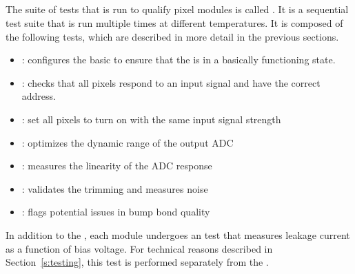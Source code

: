 
\newpage

\subsection{\fulltest}
\label{ss:fulltest}

The suite of tests that is run to qualify pixel modules is called
\fulltest. It is a sequential test suite that is run multiple times at
different temperatures. It is composed of the following tests, which
are described in more detail in the previous sections.
\begin{itemize}
  \item \pretest: configures the basic \dacs to ensure that the \roc is in a basically functioning state.
  \item \alivetest: checks that all pixels respond to an input signal and have the correct address.
  \item \trimming: set all pixels to turn on with the same input signal strength
  \item \phopt: optimizes the dynamic range of the output ADC
  \item \gainped: measures the linearity of the ADC response
  \item \scurves: validates the trimming and measures noise
  \item \bb: flags potential issues in bump bond quality
\end{itemize}
In addition to the \fulltest, each module undergoes an \iv test that measures leakage current as a function of bias voltage.
For technical reasons described in Section~\ref{s:testing}, this test is performed separately from the \fulltest.
